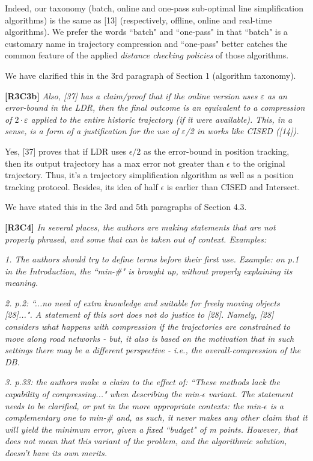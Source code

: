 \documentclass{letter}
\begin{document}
Indeed, our taxonomy (batch, online and one-pass sub-optimal line simplification algorithms) is the same as [13] (respectively, offline, online and real-time algorithms). 
We prefer the words ``batch" and ``one-pass" in that ``batch" is a customary name in trajectory compression and ``one-pass" better catches the common feature of the applied \emph{distance checking policies} of those algorithms.  

We have clarified this in the 3rd paragraph of Section 1 (algorithm taxonomy). 

\textbf{[R3C3b]} \emph{Also, [37] has a claim/proof that if the online version uses $\varepsilon$ as an error-bound in the LDR, then the final outcome is an equivalent to a compression of $2 \cdot \varepsilon$ applied to the entire historic trajectory (if it were available). This, in a sense, is a form of a justification for the use of $\varepsilon$/2 in works like CISED ([14]).}

{Yes, [37] proves that if LDR uses $\epsilon/2$ as the error-bound in position tracking, then its output trajectory has a max error not greater than $\epsilon$ to the original trajectory. Thus, it's a trajectory simplification algorithm as well as a position tracking protocol.} Besides, its idea of half $\epsilon$ is earlier than CISED and Intersect.

We have stated this in the 3rd and 5th paragraphs of Section 4.3. 

\textbf{[R3C4]} \emph{
In several places, the authors are making statements that are not properly phrased, and some that can be taken out of context. Examples:}

\emph{1. The authors should try to define terms before their first use. Example: on p.1 in the Introduction, the ``min-\#" is brought up, without properly explaining its meaning.}


\emph{2. p.2: ``...no need of extra knowledge and suitable for freely moving objects [28]...". A statement of this sort does not do justice to [28].
Namely, [28] considers what happens with compression if the trajectories are constrained to move along road networks - but, it also is based on the motivation that in such settings there may be a different perspective - i.e., the overall-compression of the DB.}


\emph{3. p.33: the authors make a claim to the effect of: ``These methods lack the capability of compressing..." when describing the min-$\epsilon$ variant. The statement needs to be clarified, or put in the more appropriate contexts: the min-$\epsilon$  is a complementary one to min-\# and, as such, it never makes any other claim that it will yield the minimum error, given a fixed ``budget" of m points. However, that does not mean that this variant of the problem, and the algorithmic solution, doesn't have its own merits.}
\end{document}
